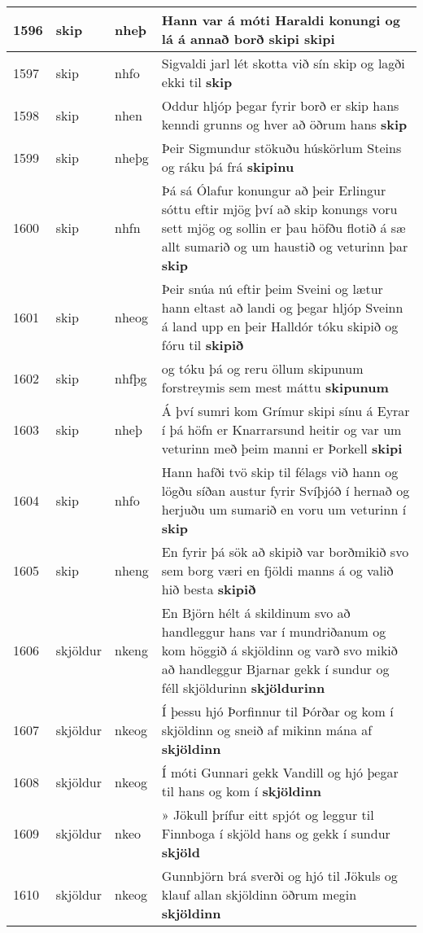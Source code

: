 \documentclass{article}
\begin{document}
\begin{longtable}{p{1cm}|p{1cm}|p{1cm}|p{13cm}}
\hline
1596&skip&nheþ&Hann var á móti Haraldi konungi og lá á annað borð skipi \textbf{skipi} \\
\hline
1597&skip&nhfo&Sigvaldi jarl lét skotta við sín skip og lagði ekki til \textbf{skip} \\
\hline
1598&skip&nhen&Oddur hljóp þegar fyrir borð er skip hans kenndi grunns og hver að öðrum hans \textbf{skip} \\
\hline
1599&skip&nheþg&Þeir Sigmundur stökuðu húskörlum Steins og ráku þá frá \textbf{skipinu} \\
\hline
1600&skip&nhfn&Þá sá Ólafur konungur að þeir Erlingur sóttu eftir mjög því að skip konungs voru sett mjög og sollin er þau höfðu flotið á sæ allt sumarið og um haustið og veturinn þar \textbf{skip} \\
\hline
1601&skip&nheog&Þeir snúa nú eftir þeim Sveini og lætur hann eltast að landi og þegar hljóp Sveinn á land upp en þeir Halldór tóku skipið og fóru til \textbf{skipið} \\
\hline
1602&skip&nhfþg&og tóku þá og reru öllum skipunum forstreymis sem mest máttu \textbf{skipunum} \\
\hline
1603&skip&nheþ&Á því sumri kom Grímur skipi sínu á Eyrar í þá höfn er Knarrarsund heitir og var um veturinn með þeim manni er Þorkell \textbf{skipi} \\
\hline
1604&skip&nhfo&Hann hafði tvö skip til félags við hann og lögðu síðan austur fyrir Svíþjóð í hernað og herjuðu um sumarið en voru um veturinn í \textbf{skip} \\
\hline
1605&skip&nheng&En fyrir þá sök að skipið var borðmikið svo sem borg væri en fjöldi manns á og valið hið besta \textbf{skipið} \\
\hline
1606&skjöldur&nkeng&En Björn hélt á skildinum svo að handleggur hans var í mundriðanum og kom höggið á skjöldinn og varð svo mikið að handleggur Bjarnar gekk í sundur og féll skjöldurinn \textbf{skjöldurinn} \\
\hline
1607&skjöldur&nkeog&Í þessu hjó Þorfinnur til Þórðar og kom í skjöldinn og sneið af mikinn mána af \textbf{skjöldinn} \\
\hline
1608&skjöldur&nkeog&Í móti Gunnari gekk Vandill og hjó þegar til hans og kom í \textbf{skjöldinn} \\
\hline
1609&skjöldur&nkeo&» Jökull þrífur eitt spjót og leggur til Finnboga í skjöld hans og gekk í sundur \textbf{skjöld} \\
\hline
1610&skjöldur&nkeog&Gunnbjörn brá sverði og hjó til Jökuls og klauf allan skjöldinn öðrum megin \textbf{skjöldinn} \\

\end{longtable}
\end{document}
